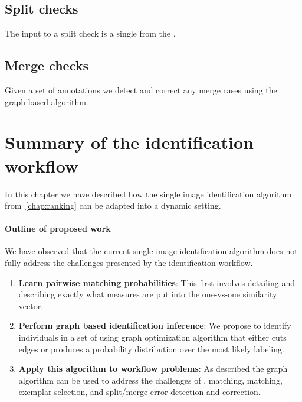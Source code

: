     \subsection{Split checks}
        The input to a split check is a single \name{} from the \masterdatabase{}.
        
    \subsection{Merge checks}
        Given a set of annotations we detect and correct any merge cases using the graph-based algorithm.
        
\section{Summary of the identification workflow}
    In this chapter we have described how the single image identification algorithm from~\cref{chap:ranking} can be
      adapted into a dynamic setting.
    
    \paragraph{Outline of proposed work}
    We have observed that the current single image identification algorithm does not fully address the challenges
      presented by the identification workflow.
    \begin{enumerate}
        \item \textbf{Learn pairwise matching probabilities}:
            This first involves detailing and describing exactly what measures are put into the one-vs-one similarity
              vector.
            
        \item \textbf{Perform graph based identification inference}:
            We propose to identify individuals in a set of \annots{} using graph optimization algorithm that either
              cuts edges or produces a probability distribution over the most likely \annot{} labeling.
            
        \item \textbf{Apply this algorithm to workflow problems}:
            As described the graph algorithm can be used to address the challenges of \intraoccurrence{}, matching,
              \vsexemplar{} matching, exemplar selection, and split/merge error detection and correction.
    \end{enumerate}
    
